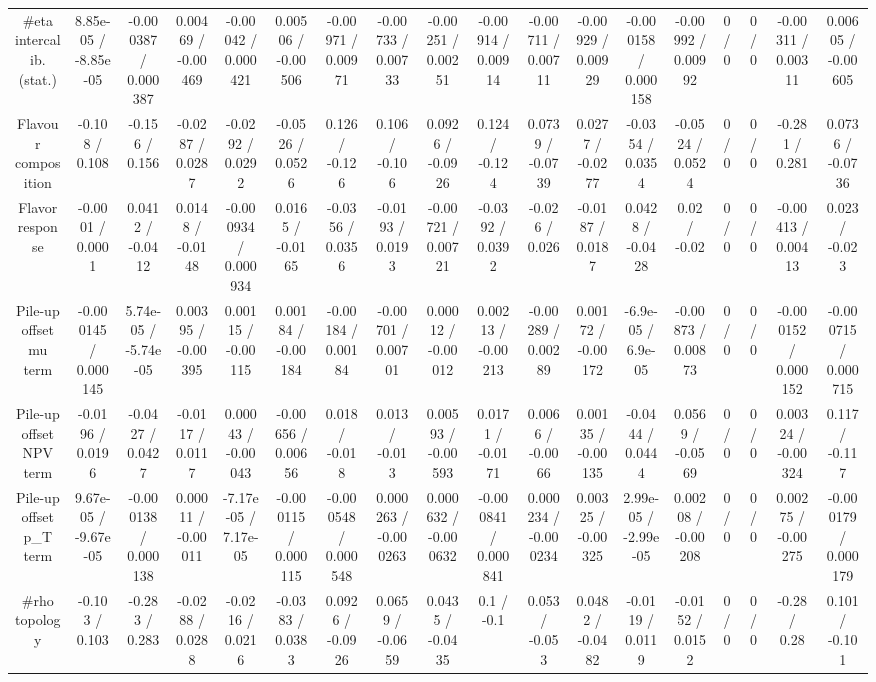 \documentclass[10pt]{article}
\begin{document}
\begin{table}[htbp]
\begin{center}
\begin{tabular}{|c|c|c|c|c|c|c|c|c|c|c|c|c|c|c|c|c|c|}
  #eta intercalib. (stat.) & 8.85e-05 / -8.85e-05 & -0.000387 / 0.000387 & 0.00469 / -0.00469 & -0.00042 / 0.000421 & 0.00506 / -0.00506 & -0.00971 / 0.00971 & -0.00733 / 0.00733 & -0.00251 / 0.00251 & -0.00914 / 0.00914 & -0.00711 / 0.00711 & -0.00929 / 0.00929 & -0.000158 / 0.000158 & -0.00992 / 0.00992 & 0 / 0 & 0 / 0 & -0.00311 / 0.00311 & 0.00605 / -0.00605 \\ 
  Flavour composition & -0.108 / 0.108 & -0.156 / 0.156 & -0.0287 / 0.0287 & -0.0292 / 0.0292 & -0.0526 / 0.0526 & 0.126 / -0.126 & 0.106 / -0.106 & 0.0926 / -0.0926 & 0.124 / -0.124 & 0.0739 / -0.0739 & 0.0277 / -0.0277 & -0.0354 / 0.0354 & -0.0524 / 0.0524 & 0 / 0 & 0 / 0 & -0.281 / 0.281 & 0.0736 / -0.0736 \\ 
  Flavor response & -0.0001 / 0.0001 & 0.0412 / -0.0412 & 0.0148 / -0.0148 & -0.000934 / 0.000934 & 0.0165 / -0.0165 & -0.0356 / 0.0356 & -0.0193 / 0.0193 & -0.00721 / 0.00721 & -0.0392 / 0.0392 & -0.026 / 0.026 & -0.0187 / 0.0187 & 0.0428 / -0.0428 & 0.02 / -0.02 & 0 / 0 & 0 / 0 & -0.00413 / 0.00413 & 0.023 / -0.023 \\ 
  Pile-up offset mu term & -0.000145 / 0.000145 & 5.74e-05 / -5.74e-05 & 0.00395 / -0.00395 & 0.00115 / -0.00115 & 0.00184 / -0.00184 & -0.00184 / 0.00184 & -0.00701 / 0.00701 & 0.00012 / -0.00012 & 0.00213 / -0.00213 & -0.00289 / 0.00289 & 0.00172 / -0.00172 & -6.9e-05 / 6.9e-05 & -0.00873 / 0.00873 & 0 / 0 & 0 / 0 & -0.000152 / 0.000152 & -0.000715 / 0.000715 \\ 
  Pile-up offset NPV term & -0.0196 / 0.0196 & -0.0427 / 0.0427 & -0.0117 / 0.0117 & 0.00043 / -0.00043 & -0.00656 / 0.00656 & 0.018 / -0.018 & 0.013 / -0.013 & 0.00593 / -0.00593 & 0.0171 / -0.0171 & 0.0066 / -0.0066 & 0.00135 / -0.00135 & -0.0444 / 0.0444 & 0.0569 / -0.0569 & 0 / 0 & 0 / 0 & 0.00324 / -0.00324 & 0.117 / -0.117 \\ 
  Pile-up offset p_{T} term & 9.67e-05 / -9.67e-05 & -0.000138 / 0.000138 & 0.00011 / -0.00011 & -7.17e-05 / 7.17e-05 & -0.000115 / 0.000115 & -0.000548 / 0.000548 & 0.000263 / -0.000263 & 0.000632 / -0.000632 & -0.000841 / 0.000841 & 0.000234 / -0.000234 & 0.00325 / -0.00325 & 2.99e-05 / -2.99e-05 & 0.00208 / -0.00208 & 0 / 0 & 0 / 0 & 0.00275 / -0.00275 & -0.000179 / 0.000179 \\ 
  #rho topology & -0.103 / 0.103 & -0.283 / 0.283 & -0.0288 / 0.0288 & -0.0216 / 0.0216 & -0.0383 / 0.0383 & 0.0926 / -0.0926 & 0.0659 / -0.0659 & 0.0435 / -0.0435 & 0.1 / -0.1 & 0.053 / -0.053 & 0.0482 / -0.0482 & -0.0119 / 0.0119 & -0.0152 / 0.0152 & 0 / 0 & 0 / 0 & -0.28 / 0.28 & 0.101 / -0.101 \\ 

\end{tabular}
\end{center}
\end{table}
\end{document}
